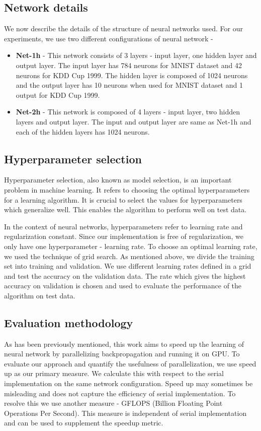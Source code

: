 \subsection{Network details}
\label{sub:net_det}
We now describe the details of the structure of neural networks used. For our experiments, we use two different configurations of neural network - 
\begin{itemize}
\item \textbf{Net-1h} - This network consists of 3 layers - input layer, one hidden layer and output layer. The input layer has 784 neurons for MNIST dataset and 42 neurons for KDD Cup 1999. The hidden layer is composed of 1024 neurons and the output layer has 10 neurons when used for MNIST dataset and 1 output for KDD Cup 1999.
\item \textbf{Net-2h} - This network is composed of 4 layers - input layer, two hidden layers and output layer. The input and output layer are same as Net-1h and each of the hidden layers has 1024 neurons.
\end{itemize}

\subsection{Hyperparameter selection}
\label{sub:hyper_sel}
Hyperparameter selection, also known as model selection, is an important problem in machine learning. It refers to choosing the optimal hyperparameters for a learning algorithm. It is crucial to select the values for hyperparameters which generalize well. This enables the algorithm to perform well on test data.

In the context of neural networks, hyperparameters refer to learning rate and regularization constant. Since our implementation is free of regularization, we only have one hyperparameter - learning rate. To choose an optimal learning rate, we used the technique of grid search. As mentioned above, we divide the training set into training and validation. We use different learning rates defined in a grid and test the accuracy on the validation data. The rate which gives the highest accuracy on validation is chosen and used to evaluate the performance of the algorithm on test data.

\subsection{Evaluation methodology}
\label{sub:eval}
As has been previously mentioned, this work aims to speed up the learning of neural network by parallelizing backpropagation and running it on GPU. To evaluate our approach and quantify the usefulness of parallelization, we use speed up as our primary measure. We calculate this with respect to the serial implementation on the same network configuration. Speed up may sometimes be misleading and does not capture the efficiency of serial implementation. To resolve this we use another measure - GFLOPS (Billion Floating Point Operations Per Second). This measure is independent of serial implementation and can be used to supplement the speedup metric.

